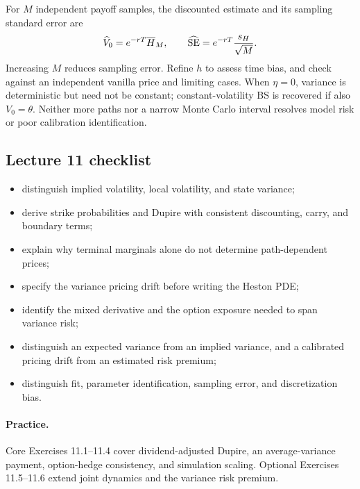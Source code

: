 For \(M\) independent payoff samples, the discounted estimate and its
sampling standard error are
\[
\widehat V_0=e^{-rT}\overline H_M,\qquad
\widehat{\rm SE}=e^{-rT}\frac{s_H}{\sqrt M}.
\]
Increasing \(M\) reduces sampling error. Refine \(h\) to assess time bias,
and check against an independent vanilla price and limiting cases.
When \(\eta=0\), variance is deterministic but need not be constant;
constant-volatility BS is recovered if also \(V_0=\theta\).
Neither more paths nor a narrow Monte Carlo interval resolves model risk
or poor calibration identification.

\subsection*{Lecture 11 checklist}
\begin{itemize}[leftmargin=1.5em,itemsep=0.15em]
\item distinguish implied volatility, local volatility, and state variance;
\item derive strike probabilities and Dupire with consistent discounting, carry, and boundary terms;
\item explain why terminal marginals alone do not determine path-dependent prices;
\item specify the variance pricing drift before writing the Heston PDE;
\item identify the mixed derivative and the option exposure needed to span variance risk;
\item distinguish an expected variance from an implied variance, and a calibrated pricing drift from an estimated risk premium;
\item distinguish fit, parameter identification, sampling error, and discretization bias.
\end{itemize}
\paragraph{Practice.} Core Exercises 11.1--11.4 cover dividend-adjusted
Dupire, an average-variance payment, option-hedge consistency, and
simulation scaling. Optional Exercises 11.5--11.6 extend joint dynamics
and the variance risk premium.
